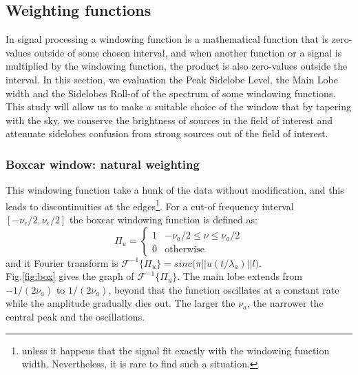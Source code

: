 \documentclass[useAMS,usenatbib]{mn2e}
\begin{document}
\subsection{Weighting functions}
In signal processing a windowing function is a mathematical function that is zero-values outside of some chosen interval, and when another 
function or a signal is multiplied by the windowing function, the product is also zero-values outside the interval.
In this section, we evaluation the Peak Sidelobe Level, the Main 
Lobe width and the Sidelobes Roll-of of the spectrum of some windowing functions. This study will allow us to make 
a suitable choice of the window that by tapering with the sky, we conserve the brightness of sources in the field of interest and  
attenuate sidelobes confusion from strong sources out of the field of interest.
\subsubsection{Boxcar window: natural weighting}
This windowing function take a hunk of the data without modification, and  this leads to discontinuities at the edges\footnote{unless it 
happens that the signal  fit exactly with the windowing function width. Nevertheless, it is rare to find such a situation.}. For 
a cut-of frequency interval  $[-\nu_e/2,\nu_e/2]$ the boxcar windowing function is defined as:
\begin{equation}
\Pi_{u}=\left\{
\begin{array}{rl}
1 & \mbox{$-\nu_a/2 \leq \nu \leq \nu_a/2$} \\
0 & \mbox{otherwise}
\end{array}\right.
\end{equation}
and it Fourier transform is $\mathcal{F}^{-1}\big\{\Pi_{u}\big\}=sinc\big(\pi ||u(t/\lambda_a)|| l\big)$.\\
Fig.\ref{fig:box} gives the graph of $\mathcal{F}^{-1}\big\{\Pi_{u}\big\}$. The main lobe extends from $-1/(2\nu_a)$ to $1/(2\nu_a)$, 
beyond that the function oscillates at a constant rate while the amplitude gradually dies out. The larger the $\nu_a$, the narrower the 
central peak and the oscillations.
\end{document}
